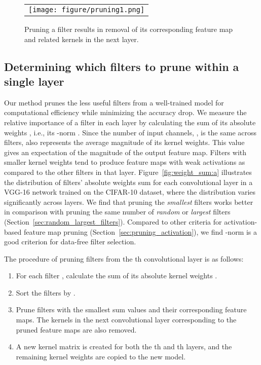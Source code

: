 \documentclass{article} \usepackage{iclr2017_conference,times}
\begin{document}
\begin{figure*}[htbp]
\centering
\begin{tabular}{l}
      \texttt{[image: figure/pruning1.png]}
\end{tabular}
\caption{Pruning a filter results in removal of its corresponding feature map and related kernels in the next layer. 
}
\label{fig:pruning}
\end{figure*}

\subsection{Determining which filters to prune within a single layer}
Our method prunes the less useful filters from a well-trained model for computational efficiency while minimizing the accuracy drop.
We measure the relative importance of a filter in each layer by calculating the sum of its absolute weights , i.e., its -norm .
Since the number of input channels, , is the same across filters,  also represents the average magnitude of its kernel weights.
This value gives an expectation of the magnitude of the output feature map.
Filters with smaller kernel weights tend to produce feature maps with weak activations as compared to the other filters in that layer.
Figure~\ref{fig:weight_sum:a} illustrates the distribution of filters' absolute weights sum for each convolutional layer in a VGG-16 network trained on the CIFAR-10 dataset, where the distribution varies significantly across layers.
We find that pruning the \emph{smallest} filters works better in comparison with pruning the same number of \emph{random} or \emph{largest} filters (Section~\ref{sec:random_largest_filters}). 
Compared to other criteria for activation-based feature map pruning (Section~\ref{sec:pruning_activation}), we find -norm is a good criterion for data-free filter selection.

The procedure of pruning  filters from the th convolutional layer is as follows:
\begin{enumerate}
\item For each filter , calculate the sum of its absolute kernel weights .
\vspace{-1mm}
\item Sort the filters by .
\vspace{-1mm}
\item Prune  filters with the smallest sum values and their corresponding feature maps. 
The kernels in the next convolutional layer corresponding to the pruned feature maps are also removed.
\vspace{-1mm}
\item A new kernel matrix is created for both the th and th layers, and the remaining kernel weights are copied to the new model.
\end{enumerate}
\end{document}
